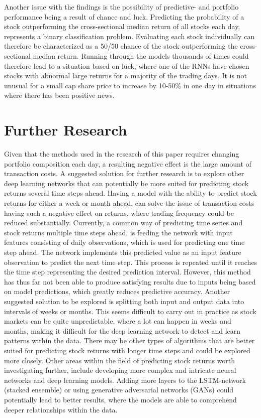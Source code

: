 \indent\newline
Another issue with the findings is the possibility of predictive- and portfolio performance being a result of chance and luck. Predicting the probability of a stock outperforming the cross-sectional median return of all stocks each day, represents a binary classification problem. Evaluating each stock individually can therefore be characterized as a 50/50 chance of the stock outperforming the cross-sectional median return. Running through the models thousands of times could therefore lead to a situation based on luck, where one of the RNNs have chosen stocks with abnormal large returns for a majority of the trading days. It is not unusual for a small cap share price to increase by 10-50\% in one day in situations where there has been positive news.    

\section{Further Research}
Given that the methods used in the research of this paper requires changing portfolio composition each day, a resulting negative effect is the large amount of transaction costs. A suggested solution for further research is to explore other deep learning networks that can potentially be more suited for predicting stock returns several time steps ahead. Having a model with the ability to predict stock returns for either a week or month ahead, can solve the issue of transaction costs having such a negative effect on returns, where trading frequency could be reduced substantially. Currently, a common way of predicting time series and stock returns multiple time steps ahead, is feeding the network with input features consisting of daily observations, which is used for predicting one time step ahead. The network implements this predicted value as an input feature observation to predict the next time step. This process is repeated until it reaches the time step representing the desired prediction interval. However, this method has thus far not been able to produce satisfying results due to inputs being based on model predictions, which greatly reduces predictive accuracy. Another suggested solution to be explored is splitting both input and output data into intervals of weeks or months. This seems difficult to carry out in practice as stock markets can be quite unpredictable, where a lot can happen in weeks and months, making it difficult for the deep learning network to detect and learn patterns within the data. There may be other types of algorithms that are better suited for predicting stock returns with longer time steps and could be explored more closely. Other areas within the field of predicting stock returns worth investigating further, include developing more complex and intricate neural networks and deep learning models. Adding more layers to the LSTM-network (stacked ensemble) or using generative adversarial networks (GANs) could potentially lead to better results, where the models are able to comprehend deeper relationships within the data.  

